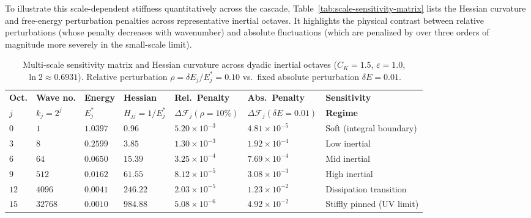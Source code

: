 \documentclass[12pt,a4paper]{article}
\theoremstyle{definition}
\theoremstyle{plain}
\theoremstyle{remark}
\begin{document}
To illustrate this scale-dependent stiffness quantitatively across the cascade, Table~\ref{tab:scale-sensitivity-matrix} lists the Hessian curvature and free-energy perturbation penalties across representative inertial octaves. It highlights the physical contrast between relative perturbations (whose penalty decreases with wavenumber) and absolute fluctuations (which are penalized by over three orders of magnitude more severely in the small-scale limit).

\begin{table}[htbp]
\centering
\footnotesize
\setlength{\tabcolsep}{2.5pt}
\renewcommand{\arraystretch}{1.18}
\begin{tabular}{C{0.05\textwidth}C{0.09\textwidth}C{0.10\textwidth}C{0.10\textwidth}C{0.16\textwidth}C{0.16\textwidth}L{0.24\textwidth}}
\toprule
\textbf{Oct.} & \textbf{Wave no.} & \textbf{Energy} & \textbf{Hessian} & \textbf{Rel.\ Penalty} & \textbf{Abs.\ Penalty} & \textbf{Sensitivity} \\
$j$ & $k_j = 2^j$ & $E_j^*$ & $H_{jj} = 1/E_j^*$ & $\Delta\mathcal{F}_j(\rho=10\%)$ & $\Delta\mathcal{F}_j(\delta E=0.01)$ & \textbf{Regime} \\
\midrule
$0$ & $1$ & $1.0397$ & $0.96$ & $5.20 \times 10^{-3}$ & $4.81 \times 10^{-5}$ & Soft (integral boundary) \\
$3$ & $8$ & $0.2599$ & $3.85$ & $1.30 \times 10^{-3}$ & $1.92 \times 10^{-4}$ & Low inertial \\
$6$ & $64$ & $0.0650$ & $15.39$ & $3.25 \times 10^{-4}$ & $7.69 \times 10^{-4}$ & Mid inertial \\
$9$ & $512$ & $0.0162$ & $61.55$ & $8.12 \times 10^{-5}$ & $3.08 \times 10^{-3}$ & High inertial \\
$12$ & $4096$ & $0.0041$ & $246.22$ & $2.03 \times 10^{-5}$ & $1.23 \times 10^{-2}$ & Dissipation transition \\
$15$ & $32768$ & $0.0010$ & $984.88$ & $5.08 \times 10^{-6}$ & $4.92 \times 10^{-2}$ & Stiffly pinned (UV limit) \\
\bottomrule
\end{tabular}
\caption{Multi-scale sensitivity matrix and Hessian curvature across dyadic inertial octaves ($C_K = 1.5$, $\varepsilon = 1.0$, $\ln 2 \approx 0.6931$). Relative perturbation $\rho = \delta E_j/E_j^* = 0.10$ vs.\ fixed absolute perturbation $\delta E = 0.01$.}
\label{tab:scale-sensitivity-matrix}\label{tab:skalen-sensitivitaetsmatrix}
\end{table}
\end{document}
